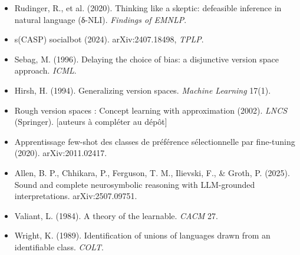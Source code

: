 \documentclass[11pt]{article}
\begin{document}
\begin{itemize}
\item Rudinger, R., et al. (2020). Thinking like a skeptic: defeasible inference in natural language (δ-NLI). \emph{Findings of EMNLP}.
\item s(CASP) socialbot (2024). arXiv:2407.18498, \emph{TPLP}.
\item Sebag, M. (1996). Delaying the choice of bias: a disjunctive version space approach. \emph{ICML}.
\item Hirsh, H. (1994). Generalizing version spaces. \emph{Machine Learning} 17(1).
\item Rough version spaces : Concept learning with approximation (2002). \emph{LNCS} (Springer). [auteurs à compléter au dépôt]
\item Apprentissage few-shot des classes de préférence sélectionnelle par fine-tuning (2020). arXiv:2011.02417.
\item Allen, B. P., Chhikara, P., Ferguson, T. M., Ilievski, F., \& Groth, P. (2025). Sound and complete neurosymbolic reasoning with LLM-grounded interpretations. arXiv:2507.09751.
\item Valiant, L. (1984). A theory of the learnable. \emph{CACM} 27.
\item Wright, K. (1989). Identification of unions of languages drawn from an identifiable class. \emph{COLT}.

\end{itemize}
\end{document}
